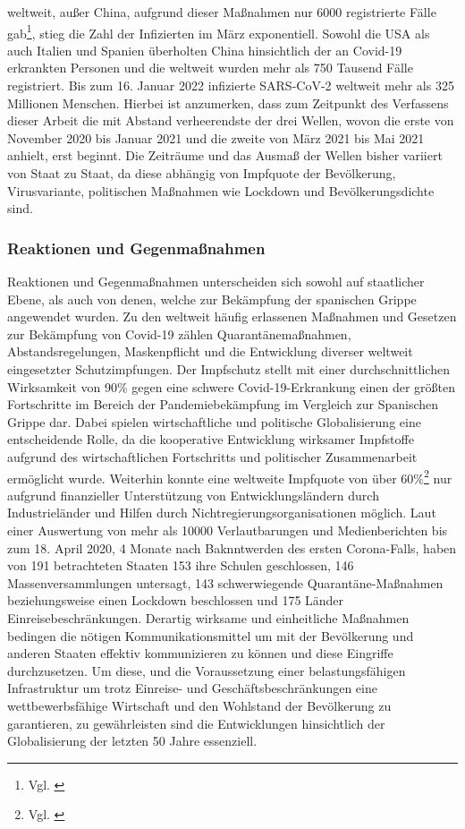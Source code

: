 \documentclass[12pt]{article}
\begin{document}
weltweit, außer China, aufgrund dieser Maßnahmen nur 6000 registrierte Fälle gab\footnote{Vgl. \cite{Feb2020}}, stieg die Zahl der Infizierten im März exponentiell. Sowohl die USA als auch Italien und Spanien überholten China hinsichtlich der an Covid-19 erkrankten Personen und die weltweit wurden mehr als 750 Tausend Fälle registriert. Bis zum 16. Januar 2022 infizierte SARS-CoV-2 weltweit mehr als 325 Millionen Menschen. Hierbei ist anzumerken, dass zum Zeitpunkt des Verfassens dieser Arbeit die mit Abstand verheerendste der drei Wellen, wovon die erste von November 2020 bis Januar 2021 und die zweite von März 2021 bis Mai 2021 anhielt, erst beginnt. Die Zeiträume und das Ausmaß der Wellen bisher variiert von Staat zu Staat, da diese abhängig von Impfquote der Bevölkerung, Virusvariante, politischen Maßnahmen wie Lockdown und Bevölkerungsdichte sind.
\subsubsection{Reaktionen und Gegenmaßnahmen}
Reaktionen und Gegenmaßnahmen unterscheiden sich sowohl auf staatlicher Ebene, als auch von denen, welche zur Bekämpfung der spanischen Grippe angewendet wurden. Zu den weltweit häufig erlassenen Maßnahmen und Gesetzen zur Bekämpfung von Covid-19 zählen Quarantänemaßnahmen, Abstandsregelungen, Maskenpflicht und die Entwicklung diverser weltweit eingesetzter Schutzimpfungen. Der Impfschutz stellt mit einer durchschnittlichen Wirksamkeit von 90\% gegen eine schwere Covid-19-Erkrankung einen der größten Fortschritte im Bereich der Pandemiebekämpfung im Vergleich zur Spanischen Grippe dar. Dabei spielen wirtschaftliche und politische Globalisierung eine entscheidende Rolle, da die kooperative Entwicklung wirksamer Impfstoffe aufgrund des wirtschaftlichen Fortschritts und politischer Zusammenarbeit ermöglicht wurde. Weiterhin konnte eine weltweite Impfquote von über 60\%\footnote{Vgl. \cite{NYT22}} nur aufgrund finanzieller Unterstützung von Entwicklungsländern durch Industrieländer und Hilfen durch Nichtregierungsorganisationen möglich. Laut einer Auswertung von mehr als 10000 Verlautbarungen und Medienberichten bis zum 18. April 2020, 4 Monate nach Baknntwerden des ersten Corona-Falls, haben von 191 betrachteten Staaten 153 ihre Schulen geschlossen, 146 Massenversammlungen untersagt, 143 schwerwiegende Quarantäne-Maßnahmen beziehungsweise einen Lockdown beschlossen und 175 Länder Einreisebeschränkungen. Derartig wirksame und einheitliche Maßnahmen bedingen die nötigen Kommunikationsmittel um mit der Bevölkerung und anderen Staaten effektiv kommunizieren zu können und diese Eingriffe durchzusetzen. Um diese, und die Voraussetzung einer belastungsfähigen Infrastruktur um trotz Einreise- und Geschäftsbeschränkungen eine wettbewerbsfähige Wirtschaft und den Wohlstand der Bevölkerung zu garantieren, zu gewährleisten sind die Entwicklungen hinsichtlich der Globalisierung der letzten 50 Jahre essenziell.
\end{document}
